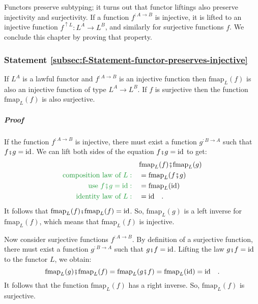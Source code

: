 Functors preserve subtyping; it turns out that functor liftings also
preserve injectivity and surjectivity. If a function $f^{:A\rightarrow B}$
is injective, it is lifted to an injective function $f^{\uparrow L}:L^{A}\rightarrow L^{B}$,
and similarly for surjective functions $f$. We conclude this chapter
by proving that property.

\subsubsection{Statement \label{subsec:f-Statement-functor-preserves-injective}\ref{subsec:f-Statement-functor-preserves-injective}}

If $L^{A}$ is a lawful functor and $f^{:A\rightarrow B}$ is an injective
function then $\text{fmap}_{L}(f)$ is also an injective function
of type $L^{A}\rightarrow L^{B}$. If $f$ is surjective then the
function $\text{fmap}_{L}(f)$ is also surjective.

\subparagraph{Proof}

If the function $f^{:A\rightarrow B}$ is injective, there must exist
a function $g^{:B\rightarrow A}$ such that $f\bef g=\text{id}$.
We can lift both sides of the equation $f\bef g=\text{id}$ to get:
\begin{align*}
 & \text{fmap}_{L}(f)\bef\text{fmap}_{L}(g)\\
{\color{greenunder}\text{composition law of }L:}\quad & =\text{fmap}_{L}(f\bef g)\\
{\color{greenunder}\text{use }f\bef g=\text{id}:}\quad & =\text{fmap}_{L}(\text{id})\\
{\color{greenunder}\text{identity law of }L:}\quad & =\text{id}\quad.
\end{align*}
It follows that $\text{fmap}_{L}(f)\bef\text{fmap}_{L}(f)=\text{id}$.
So, $\text{fmap}_{L}(g)$ is a left inverse for $\text{fmap}_{L}(f)$,
which means that $\text{fmap}_{L}(f)$ is injective.

Now consider surjective functions $f^{:A\rightarrow B}$. By definition
of a surjective function, there must exist a function $g^{:B\rightarrow A}$
such that $g\bef f=\text{id}$. Lifting the law $g\bef f=\text{id}$
to the functor $L$, we obtain:
\[
\text{fmap}_{L}(g)\bef\text{fmap}_{L}(f)=\text{fmap}_{L}(g\bef f)=\text{fmap}_{L}(\text{id})=\text{id}\quad.
\]
It follows that the function $\text{fmap}_{L}(f)$ has a right inverse.
So, $\text{fmap}_{L}(f)$ is surjective.

